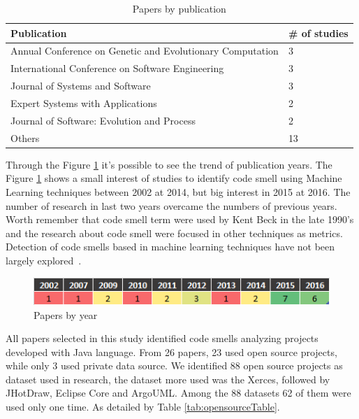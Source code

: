 \begin{table}[hbt]
\centering
\caption{Papers by publication}
\label{tab:papersByPublication}
\begin{tabular}{ll}
\hline
Publication &                                               \# of studies\\ \hline
Annual Conference on Genetic and Evolutionary Computation &     3   \\
International Conference on Software Engineering &              3   \\
Journal of Systems and Software &                               3   \\
Expert Systems with Applications &                              2   \\
Journal of Software: Evolution and Process &                    2   \\
Others &                                                        13  \\ \hline
\end{tabular}
\end{table}

Through the Figure \ref{fig:papersByYear}  it's possible to see the trend of publication years. The Figure \ref{fig:papersByYear} shows a small interest of studies to identify code smell using Machine Learning techniques between 2002 at 2014, but big interest in 2015 at 2016. The number of research in last two years overcame the numbers of previous years.  Worth remember that code smell term were used by Kent Beck in the late 1990's and the research about code smell were focused in other techniques as metrics. Detection of code smells based in machine learning techniques have not been largely explored~\citep{Fontana2013}.

\begin{figure}[hbt] 
    \centering
	\caption{Papers by year}
	\label{fig:papersByYear}
	\includegraphics[]{imagens/papersByYear.png}
\end{figure}
All papers selected in this study identified code smells analyzing projects developed with Java language. From 26 papers, 23 used open source projects, while only 3 used private data source. We identified 88 open source projects as dataset used in research, the dataset more used was the Xerces, followed by JHotDraw, Eclipse Core and ArgoUML. Among the 88 datasets 62 of them were used only one time. As detailed by Table \ref{tab:opensourceTable}.

